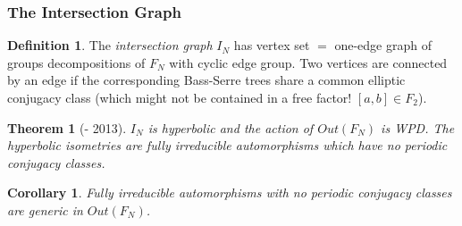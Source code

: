 \documentclass{beamer}
\theoremstyle{theorem}
\newtheorem{thm}{Theorem}
\newtheorem{cor}{Corollary}
\theoremstyle{definition}
\newtheorem*{defin}{Definition}
\renewcommand{\-}{\ensuremath{^{-1}}}
\renewcommand{\>}{\ensuremath{\rightarrow}}
\renewcommand{\(}{\langle}
\renewcommand{\)}{\rangle}
\begin{document}
\begin{frame}
\frametitle{The Intersection Graph}
\begin{defin}
The \emph{intersection graph} $I_N$ has vertex set $=$ one-edge graph of groups decompositions of $F_N$ with cyclic edge group. Two vertices are connected by an edge if the corresponding Bass-Serre trees share a common elliptic conjugacy class (which might not be contained in a free factor! $[a,b] \in F_2$). 
\end{defin}
\pause
\begin{thm}[- 2013]
$I_N$ is hyperbolic and the action of $Out(F_N)$ is WPD. The hyperbolic isometries are fully irreducible automorphisms which have no periodic conjugacy classes.
\end{thm}
\pause
\begin{cor}
Fully irreducible automorphisms with no periodic conjugacy classes are generic in $Out(F_N)$.
\end{cor}
\end{frame}



\end{document}
